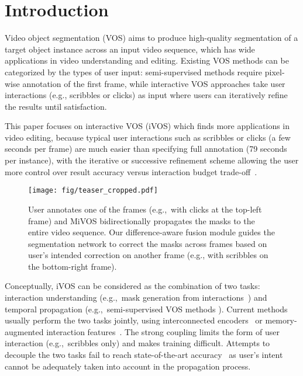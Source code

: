 \documentclass[final]{cvpr}
\begin{document}
\section{Introduction}
	Video object segmentation (VOS) aims to produce high-quality segmentation of a target object instance across an input video sequence, which has wide applications in video understanding and editing. 
	Existing VOS methods can be categorized by the types of user input: semi-supervised methods require pixel-wise annotation of the first frame, while interactive VOS approaches take user interactions (e.g., scribbles or clicks) as input where users can iteratively refine the results  until satisfaction. 


	This paper focuses on interactive VOS (iVOS) which finds more applications in video editing, because 
	typical user interactions such as scribbles or clicks (a few seconds per frame) are much easier than specifying full annotation (79 seconds per instance), with the iterative or successive refinement scheme allowing the user more control over result accuracy versus interaction budget trade-off~\cite{Caelles_arXiv_2018}.
	
	\begin{figure}[t]
		\begin{center}
			\texttt{[image: fig/teaser\_cropped.pdf]}
		\end{center}
		\vspace{-0.15in}
		\caption{
			User annotates one of the frames (e.g.,\ with clicks at the top-left frame) and MiVOS bidirectionally propagates the masks to the entire video sequence. 
			Our difference-aware fusion module guides the segmentation network to
			correct the masks across frames based on user's intended correction on another frame (e.g., with scribbles on the bottom-right frame).}
		\label{fig:teaser}
		\vspace{-0.2in}
	\end{figure}
	
	Conceptually, iVOS can be considered as the combination of two tasks: interaction understanding (e.g.,\ mask generation from interactions~\cite{rother2004grabcut, xu2017deepGrabCut, sofiiuk2020fbrs, maninis2018deepExtremePointsCut}) and temporal propagation (e.g.,\ semi-supervised VOS methods \cite{perazzi2017learningMaskTrack, oh2019videoSTM, luiten2018premvos}). Current methods usually perform the two tasks jointly, using interconnected encoders~\cite{oh2019fastInteractive, heo2019interactiveSDINet, Yuk2020IVOSGlobalLocal} or memory-augmented interaction features~\cite{miao2020memoryAggregationInteractive, Chen2020WorkshopCFBI, oh2020STMPAMI}. The strong coupling limits the form of user interaction (e.g.,\ scribbles only) and makes training difficult. Attempts to decouple the two tasks fail to reach state-of-the-art accuracy~\cite{benard2017interactiveInTheWild, Tran2020WorkshopMultiple} as user's intent cannot be adequately taken into account in the propagation process.
	
\end{document}
